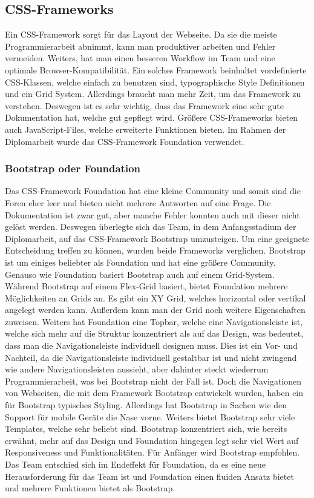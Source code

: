 \subsection{CSS-Frameworks} 
Ein CSS-Framework sorgt für das Layout der Webseite. Da sie die meiste Programmierarbeit abnimmt, kann man produktiver arbeiten und Fehler vermeiden. Weiters, hat man einen besseren Workflow im Team und eine optimale Browser-Kompatibilität. 
Ein solches Framework beinhaltet vordefinierte CSS-Klassen, welche einfach zu benutzen sind, typographische Style Definitionen und ein Grid System.  
Allerdings braucht man mehr Zeit, um das Framework zu verstehen. Deswegen ist es sehr wichtig, dass das Framework eine sehr gute Dokumentation hat, welche gut gepflegt wird. Größere CSS-Frameworks bieten auch JavaScript-Files, welche erweiterte Funktionen bieten. Im Rahmen der Diplomarbeit wurde das CSS-Framework Foundation verwendet.
\subsubsection{Bootstrap oder Foundation}
Das CSS-Framework Foundation hat eine kleine Community und somit sind die Foren eher leer und bieten nicht mehrere Antworten auf eine Frage. Die Dokumentation ist zwar gut, aber manche Fehler konnten auch mit dieser nicht gelöst werden. Deswegen überlegte sich das Team, in dem Anfangsstadium der Diplomarbeit, auf das CSS-Framework Bootstrap umzusteigen. Um eine geeignete Entscheidung treffen zu können, wurden beide Frameworks verglichen. Bootstrap ist um einiges beliebter als Foundation und hat eine größere Community. Genauso wie Foundation basiert Bootstrap auch auf einem Grid-System. Während Bootstrap auf einem Flex-Grid basiert, bietet Foundation mehrere Möglichkeiten an Grids an. Es gibt ein XY Grid, welches horizontal oder vertikal angelegt werden kann. Außerdem kann man der Grid noch weitere Eigenschaften zuweisen.   Weiters hat Foundation eine Topbar, welche eine Navigationsleiste ist, welche sich mehr auf die Struktur konzentriert als auf das Design, was bedeutet, dass man die Navigationsleiste individuell designen muss. Dies ist ein Vor- und Nachteil, da die Navigationsleiste individuell gestaltbar ist und nicht zwingend wie andere Navigationsleisten aussieht, aber dahinter steckt wiederrum Programmierarbeit, was bei Bootstrap nicht der Fall ist. Doch die Navigationen von Webseiten, die mit dem Framework Bootstrap entwickelt wurden, haben ein für Bootstrap typisches Styling.   Allerdings hat Bootstrap in Sachen wie den Support für mobile Geräte die Nase vorne. Weiters bietet Bootstrap sehr viele Templates, welche sehr beliebt sind. Bootstrap konzentriert sich, wie bereits erwähnt, mehr auf das Design und Foundation hingegen legt sehr viel Wert auf Responsiveness und Funktionalitäten. Für Anfänger wird Bootstrap empfohlen. Das Team entschied sich im Endeffekt für Foundation, da es eine neue Herausforderung für das Team ist und Foundation einen fluiden Ansatz bietet und mehrere Funktionen bietet als Bootstrap. 

